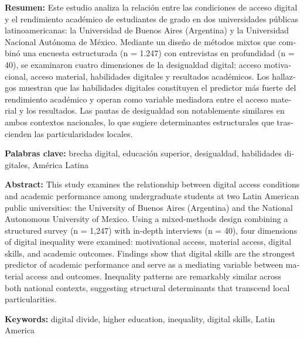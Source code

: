 \begin{tcolorbox}[colback=brown!8!white,colframe=brown!8!white,boxrule=0pt,arc=2pt,left=4pt,right=4pt,top=3pt,bottom=3pt,before skip=4pt,after skip=4pt]
\begin{otherlanguage}{spanish}
\sffamily\small \textbf{Resumen:} Este estudio analiza la relación entre las condiciones de acceso digital y el rendimiento académico de estudiantes de grado en dos universidades públicas latinoamericanas: la Universidad de Buenos Aires (Argentina) y la Universidad Nacional Autónoma de México. Mediante un diseño de métodos mixtos que combinó una encuesta estructurada (n = 1.247) con entrevistas en profundidad (n = 40), se examinaron cuatro dimensiones de la desigualdad digital: acceso motivacional, acceso material, habilidades digitales y resultados académicos. Los hallazgos muestran que las habilidades digitales constituyen el predictor más fuerte del rendimiento académico y operan como variable mediadora entre el acceso material y los resultados. Las pautas de desigualdad son notablemente similares en ambos contextos nacionales, lo que sugiere determinantes estructurales que trascienden las particularidades locales.
\par\smallskip\noindent\textbf{Palabras clave:} brecha digital, educación superior, desigualdad, habilidades digitales, América Latina
\end{otherlanguage}
\end{tcolorbox}

\begin{tcolorbox}[colback=brown!8!white,colframe=brown!8!white,boxrule=0pt,arc=2pt,left=4pt,right=4pt,top=3pt,bottom=3pt,before skip=4pt,after skip=4pt]
\begin{otherlanguage}{english}
\sffamily\small \textbf{Abstract:} This study examines the relationship between digital access conditions and academic performance among undergraduate students at two Latin American public universities: the University of Buenos Aires (Argentina) and the National Autonomous University of Mexico. Using a mixed-methods design combining a structured survey (n = 1,247) with in-depth interviews (n = 40), four dimensions of digital inequality were examined: motivational access, material access, digital skills, and academic outcomes. Findings show that digital skills are the strongest predictor of academic performance and serve as a mediating variable between material access and outcomes. Inequality patterns are remarkably similar across both national contexts, suggesting structural determinants that transcend local particularities.
\par\smallskip\noindent\textbf{Keywords:} digital divide, higher education, inequality, digital skills, Latin America
\end{otherlanguage}
\end{tcolorbox}


